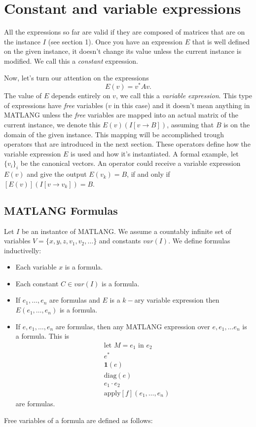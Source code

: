 \section{Constant and variable expressions}

All the expressions so far are valid if they are composed of matrices that are on the instance $I$ (see section 1). Once you have an expression $E$ that is well defined on the given instance, it doesn't change its value unless the current instance is modified. We call this a \textit{constant} expression.

Now, let's turn our attention on the expressions $$E(v)=v^* Av.$$ The value of $E$ depends entirely on $v$, we call this a \textit{variable expression}. This type of expressions have \textit{free} variables ($v$ in this case) and it doesn't mean anything in MATLANG unless the \textit{free} variables are mapped into an actual matrix of the current instance, we denote this $E(v)(I[v\rightarrow B])$, assuming that $B$ is on the domain of the given instance. This mapping will be accomplished trough operators that are introduced in the next section. These operators define how the variable expression $E$ is used and how it's instantiated.
A formal example, let $\lbrace v_i\rbrace_i$ be the canonical vectors. An operator could receive a variable expression $E(v)$ and give the output $E(v_k)=B$, if and only if $[E(v)](I[v\rightarrow v_k])=B$.

\subsection*{MATLANG Formulas}

Let $I$ be an instantce of MATLANG. We assume a countably infinite set of variables $V=\lbrace x,y,z,v_1,v_2,\ldots \rbrace$ and constants $var(I)$. We define formulas inductivelly:
\begin{itemize}
	\item Each variable $x$ is a formula.
	\item Each constant $C\in var(I)$ is a formula.
	\item If $e_1,\ldots, e_n$ are formulas and $E$ is a $k-$ary variable expression then $E(e_1,\ldots, e_n)$ is a formula.
	\item If $e, e_1,\ldots, e_n$ are formulas, then any MATLANG expression over $e,e_1,\ldots e_n$ is a formula. This is
		\begin{align*}
			&\text{let }M=e_1 \text{ in } e_2 \\
			&e^* \\
			&\mathbf{1}(e) \\
			&\text{diag}(e) \\
			&e_1\cdot e_2 \\
			&\text{apply}[f](e_1,\ldots, e_n)
		\end{align*}
		are formulas.
\end{itemize}
Free variables of a formula are defined as follows:

